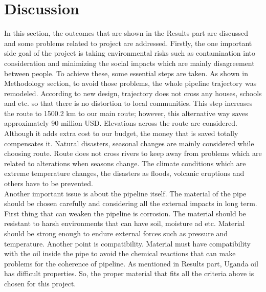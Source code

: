 \documentclass[12pt]{article}
\begin{document}
\section{Discussion}
{\fontsize{12pt}{12pt}\selectfont
\hspace*{1em}In this section, the outcomes that are shown in the Results part are discussed and some problems related to project are addressed. Firstly, the one important side goal of the project is taking environmental risks such as contamination into consideration and minimizing the social impacts which are mainly disagreement between people. To achieve these, some essential steps are taken. As shown in Methodology section, to avoid those problems, the whole pipeline trajectory was remodeled. According to new design, trajectory does not cross any houses, schools and etc. so that there is no distortion to local communities. This step increases the route to 1500.2 km to our main route; however, this alternative way saves approximately 90 million USD. Elevations across the route are considered. Although it adds extra cost to our budget, the money that is saved totally compensates it. Natural disasters, seasonal changes are mainly considered while choosing route. Route does not cross rivers to keep away from problems which are related to alterations when seasons change. The climate conditions which are extreme temperature changes, the disasters as floods, volcanic eruptions and others have to be prevented.
\\

Another important issue is about the pipeline itself. The material of the pipe should be chosen carefully and considering all the external impacts in long term. First thing that can weaken the pipeline is corrosion. The material should be resistant to harsh environments that can have soil, moisture ad etc. Material should be strong enough to endure external forces such as pressure and temperature. Another point is compatibility. Material must have compatibility with the oil inside the pipe to avoid the chemical reactions that can make problems for the coherence of pipeline. As mentioned in Results part, Uganda oil has difficult properties. So, the proper material that fits all the criteria above is chosen for this project.
\\

}
\end{document}
